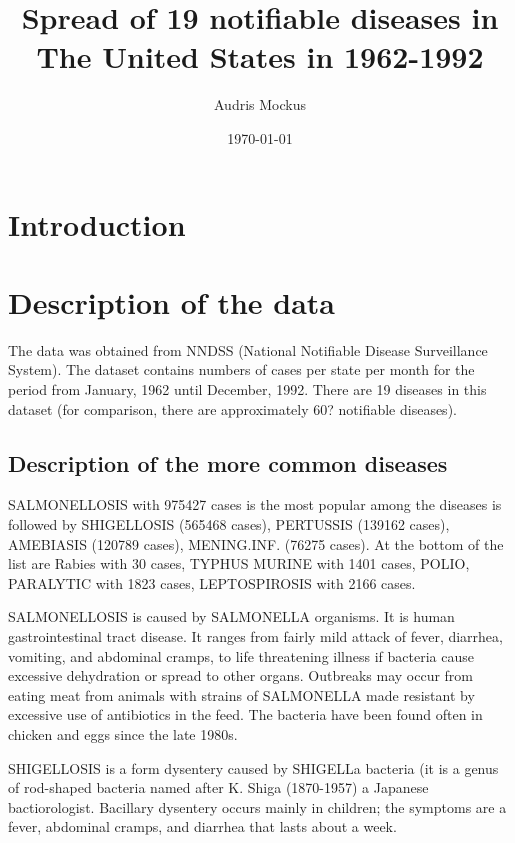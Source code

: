  \title{Spread of 19 notifiable
diseases in The United States in 1962-1992} \author{Audris Mockus}
\date{\today} \maketitle


\section{Introduction}

\section{Description of the data}

The data was obtained from NNDSS (National Notifiable Disease
Surveillance System). The dataset contains numbers of cases per
state per month for the period from January, 1962 until December,
1992.  There are 19 diseases in this dataset (for comparison, there
are approximately 60?  notifiable diseases).


\subsection{Description of the more common diseases}

SALMONELLOSIS with 975427 cases is the most popular among the
diseases is followed by SHIGELLOSIS (565468 cases), PERTUSSIS
(139162 cases), AMEBIASIS (120789 cases), MENING.INF. (76275 cases).
At the bottom of the list are Rabies with 30 cases, TYPHUS MURINE
with 1401 cases, POLIO, PARALYTIC with 1823 cases, LEPTOSPIROSIS
with 2166 cases.

SALMONELLOSIS is caused by SALMONELLA organisms. It is human
gastrointestinal tract disease. It ranges from fairly mild attack of
fever, diarrhea, vomiting, and abdominal cramps, to life threatening
illness if bacteria cause excessive dehydration or spread to other
organs. Outbreaks may occur from eating meat from animals with
strains of SALMONELLA made resistant by excessive use of antibiotics
in the feed. The bacteria have been found often in chicken and eggs
since the late 1980s.

SHIGELLOSIS is a form dysentery caused by SHIGELLa bacteria (it is a
genus of rod-shaped bacteria named after K. Shiga (1870-1957) a
Japanese bactiorologist. Bacillary dysentery occurs mainly in
children; the symptoms are a fever, abdominal cramps, and diarrhea
that lasts about a week.

